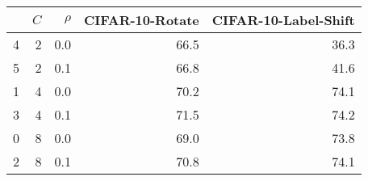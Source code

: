 \begin{tabular}{lrrrr}
\toprule
 & $C$ & $\rho$ & CIFAR-10-Rotate & CIFAR-10-Label-Shift \\
\midrule
4 & 2 & 0.0 & 66.5 & 36.3 \\
5 & 2 & 0.1 & 66.8 & 41.6 \\
1 & 4 & 0.0 & 70.2 & 74.1 \\
3 & 4 & 0.1 & 71.5 & 74.2 \\
0 & 8 & 0.0 & 69.0 & 73.8 \\
2 & 8 & 0.1 & 70.8 & 74.1 \\
\bottomrule
\end{tabular}
